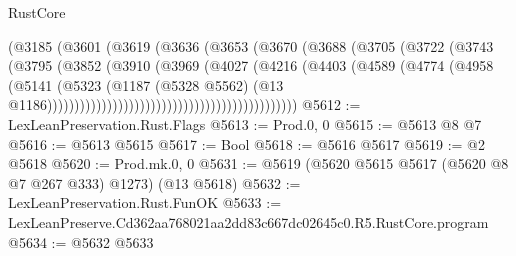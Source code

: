 \begin{lexlean}{RustCore}
\begin{coremodule}
                                                (@3185
                                                  (@3601
                                                    (@3619
                                                      (@3636
                                                        (@3653
                                                          (@3670
                                                            (@3688
                                                              (@3705
                                                                (@3722
                                                                  (@3743
                                                                    (@3795
                                                                      (@3852
                                                                        (@3910
                                                                          (@3969
                                                                            (@4027
                                                                              (@4216
                                                                                (@4403
                                                                                  (@4589
                                                                                    (@4774
                                                                                      (@4958
                                                                                        (@5141
                                                                                          (@5323
                                                                                            (@1187
                                                                                              (@5328
                                                                                                @5562)
                                                                                              (@13
                                                                                                @1186))))))))))))))))))))))))))))))))))))))))))))))
@5612 := LexLeanPreservation.Rust.Flags
@5613 := Prod.{0, 0}
@5615 := @5613 @8 @7
@5616 := @5613 @5615
@5617 := Bool
@5618 := @5616 @5617
@5619 := @2 @5618
@5620 := Prod.mk.{0, 0}
@5631 := @5619 (@5620 @5615 @5617 (@5620 @8 @7 @267 @333) @1273) (@13 @5618)
@5632 := LexLeanPreservation.Rust.FunOK
@5633 := LexLeanPreserve.Cd362aa768021aa2dd83c667dc02645c0.R5.RustCore.program
@5634 := @5632 @5633

\end{coremodule}
\end{lexlean}
